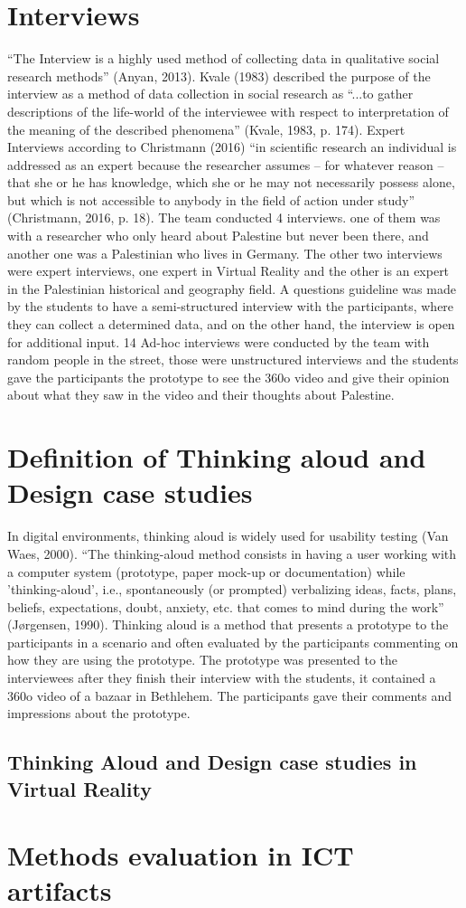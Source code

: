 \section{Interviews}

“The Interview is a highly used method of collecting data in qualitative social research methods” (Anyan, 2013). Kvale (1983) described the purpose of the interview as a method of data collection in social research as “...to gather descriptions of the life-world of the interviewee with respect to interpretation of the meaning of the described phenomena” (Kvale, 1983, p. 174). Expert Interviews according to Christmann (2016) “in scientific research an individual is addressed as an expert because the researcher assumes – for whatever reason – that she or he has knowledge, which she or he may not necessarily possess alone, but which is not accessible to anybody in the field of action under study” (Christmann, 2016, p. 18). The team conducted 4 interviews. one of them was with a researcher who only heard about Palestine but never been there, and another one was a Palestinian who lives in Germany. The other two interviews were expert interviews, one expert in Virtual Reality and the other is an expert in the Palestinian historical and geography field. A questions guideline was made by the students to have a semi-structured interview with the participants, where they can collect a determined data, and on the other hand, the interview is open for additional input. 14 Ad-hoc interviews were conducted by the team with random people in the street, those were unstructured interviews and the students gave the participants the prototype to see the 360o video and give their opinion about what they saw in the video and their thoughts about Palestine.


\section{Definition of Thinking aloud and Design case studies}

In digital environments, thinking aloud is widely used for usability testing (Van Waes, 2000). “The thinking-aloud method consists in having a user working with a computer system (prototype, paper mock-up or documentation) while 'thinking-aloud', i.e., spontaneously (or prompted) verbalizing ideas, facts, plans, beliefs, expectations, doubt, anxiety, etc. that comes to mind during the work” (Jørgensen, 1990). Thinking aloud is a method that presents a prototype to the participants in a scenario and often evaluated by the participants commenting on how they are using the prototype. The prototype was presented to the interviewees after they finish their interview with the students, it contained a 360o video of a bazaar in Bethlehem. The participants gave their comments and impressions about the prototype.


\subsection{Thinking Aloud and Design case studies in Virtual Reality}






\section{Methods evaluation in ICT artifacts}


